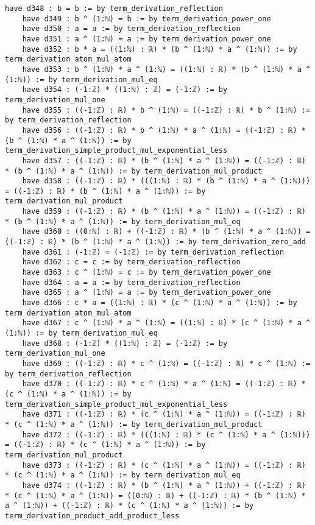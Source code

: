 \documentclass{article}
\begin{document}
\begin{tcolorbox}[colback=white!10, width=\linewidth]
\begin{lstlisting}[language=Lean4]
    have d348 : b = b := by term_derivation_reflection
    have d349 : b ^ (1:ℕ) = b := by term_derivation_power_one
    have d350 : a = a := by term_derivation_reflection
    have d351 : a ^ (1:ℕ) = a := by term_derivation_power_one
    have d352 : b * a = ((1:ℕ) : ℝ) * (b ^ (1:ℕ) * a ^ (1:ℕ)) := by term_derivation_atom_mul_atom
    have d353 : b ^ (1:ℕ) * a ^ (1:ℕ) = ((1:ℕ) : ℝ) * (b ^ (1:ℕ) * a ^ (1:ℕ)) := by term_derivation_mul_eq
    have d354 : (-1:ℤ) * ((1:ℕ) : ℤ) = (-1:ℤ) := by term_derivation_mul_one
    have d355 : ((-1:ℤ) : ℝ) * b ^ (1:ℕ) = ((-1:ℤ) : ℝ) * b ^ (1:ℕ) := by term_derivation_reflection
    have d356 : ((-1:ℤ) : ℝ) * b ^ (1:ℕ) * a ^ (1:ℕ) = ((-1:ℤ) : ℝ) * (b ^ (1:ℕ) * a ^ (1:ℕ)) := by term_derivation_simple_product_mul_exponential_less
    have d357 : ((-1:ℤ) : ℝ) * (b ^ (1:ℕ) * a ^ (1:ℕ)) = ((-1:ℤ) : ℝ) * (b ^ (1:ℕ) * a ^ (1:ℕ)) := by term_derivation_mul_product
    have d358 : ((-1:ℤ) : ℝ) * (((1:ℕ) : ℝ) * (b ^ (1:ℕ) * a ^ (1:ℕ))) = ((-1:ℤ) : ℝ) * (b ^ (1:ℕ) * a ^ (1:ℕ)) := by term_derivation_mul_product
    have d359 : ((-1:ℤ) : ℝ) * (b ^ (1:ℕ) * a ^ (1:ℕ)) = ((-1:ℤ) : ℝ) * (b ^ (1:ℕ) * a ^ (1:ℕ)) := by term_derivation_mul_eq
    have d360 : ((0:ℕ) : ℝ) + ((-1:ℤ) : ℝ) * (b ^ (1:ℕ) * a ^ (1:ℕ)) = ((-1:ℤ) : ℝ) * (b ^ (1:ℕ) * a ^ (1:ℕ)) := by term_derivation_zero_add
    have d361 : (-1:ℤ) = (-1:ℤ) := by term_derivation_reflection
    have d362 : c = c := by term_derivation_reflection
    have d363 : c ^ (1:ℕ) = c := by term_derivation_power_one
    have d364 : a = a := by term_derivation_reflection
    have d365 : a ^ (1:ℕ) = a := by term_derivation_power_one
    have d366 : c * a = ((1:ℕ) : ℝ) * (c ^ (1:ℕ) * a ^ (1:ℕ)) := by term_derivation_atom_mul_atom
    have d367 : c ^ (1:ℕ) * a ^ (1:ℕ) = ((1:ℕ) : ℝ) * (c ^ (1:ℕ) * a ^ (1:ℕ)) := by term_derivation_mul_eq
    have d368 : (-1:ℤ) * ((1:ℕ) : ℤ) = (-1:ℤ) := by term_derivation_mul_one
    have d369 : ((-1:ℤ) : ℝ) * c ^ (1:ℕ) = ((-1:ℤ) : ℝ) * c ^ (1:ℕ) := by term_derivation_reflection
    have d370 : ((-1:ℤ) : ℝ) * c ^ (1:ℕ) * a ^ (1:ℕ) = ((-1:ℤ) : ℝ) * (c ^ (1:ℕ) * a ^ (1:ℕ)) := by term_derivation_simple_product_mul_exponential_less
    have d371 : ((-1:ℤ) : ℝ) * (c ^ (1:ℕ) * a ^ (1:ℕ)) = ((-1:ℤ) : ℝ) * (c ^ (1:ℕ) * a ^ (1:ℕ)) := by term_derivation_mul_product
    have d372 : ((-1:ℤ) : ℝ) * (((1:ℕ) : ℝ) * (c ^ (1:ℕ) * a ^ (1:ℕ))) = ((-1:ℤ) : ℝ) * (c ^ (1:ℕ) * a ^ (1:ℕ)) := by term_derivation_mul_product
    have d373 : ((-1:ℤ) : ℝ) * (c ^ (1:ℕ) * a ^ (1:ℕ)) = ((-1:ℤ) : ℝ) * (c ^ (1:ℕ) * a ^ (1:ℕ)) := by term_derivation_mul_eq
    have d374 : ((-1:ℤ) : ℝ) * (b ^ (1:ℕ) * a ^ (1:ℕ)) + ((-1:ℤ) : ℝ) * (c ^ (1:ℕ) * a ^ (1:ℕ)) = ((0:ℕ) : ℝ) + ((-1:ℤ) : ℝ) * (b ^ (1:ℕ) * a ^ (1:ℕ)) + ((-1:ℤ) : ℝ) * (c ^ (1:ℕ) * a ^ (1:ℕ)) := by term_derivation_product_add_product_less

\end{lstlisting}
\end{tcolorbox}
\end{document}
